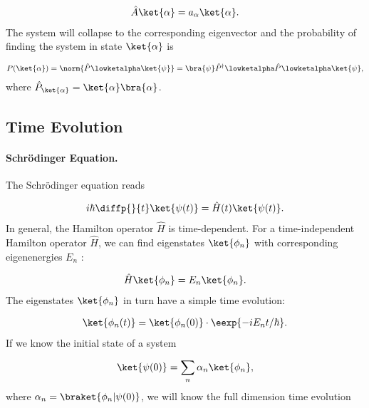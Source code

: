 \begin{align}
				\hat{A}\ket{\alpha}=a_{\alpha}\ket{\alpha}.
			
\end{align}
			The system will collapse to the corresponding eigenvector  and the probability of finding the system in state $\ket{\alpha}$ is

\begin{align}
				P(\ket{\alpha})=\norm{\hat{P}^{}\lowketalpha \ket{\psi}} = \bra{\psi} \hat{P}^{\dag}\lowketalpha \hat{P}^{}\lowketalpha \ket{\psi},
			
\end{align}
			where $\hat{P}_{\ket{\alpha}}= \ket{\alpha} \bra{\alpha}$.

\subsection{Time Evolution}

\paragraph{Schrödinger Equation.} The Schrödinger equation  reads

\begin{align}
						i\hbar\diffp{}{t}\ket{\psi(t)}=\hat{H}(t)\ket{\psi(t)}.
					
\end{align}
										In general, the Hamilton operator  $\hat{H}$ is time-dependent. For a time-independent Hamilton operator $\hat{H}$, we can find eigenstates $\ket{\phi_n}$ with corresponding eigenenergies $E_n$ :

\begin{align}
						\hat{H}\ket{\phi_n}=E_n\ket{\phi_n}.
					
\end{align}
					The eigenstates $\ket{\phi_n}$ in turn have a simple time evolution:

\begin{align}
						\ket{\phi_n(t)}=\ket{\phi_n(0)}\cdot \eexp{-i E_nt/\hbar}.
					
\end{align}
										If we know the initial state of a system

\begin{align}
						\ket{\psi(0)}=\sum_n \alpha_n\ket{\phi_n},
					
\end{align}
						where $\alpha_n=\braket{\phi_n | \psi(0)}$, we will know the full dimension time evolution

